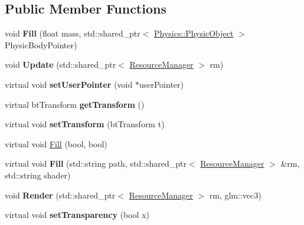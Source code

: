 \subsection*{Public Member Functions}
\begin{DoxyCompactItemize}
\item 
void {\bfseries Fill} (float mass, std\+::shared\+\_\+ptr$<$ \hyperlink{class_physics_1_1_physic_object}{Physics\+::\+Physic\+Object} $>$ Physic\+Body\+Pointer)\hypertarget{class_component_1_1_physic_component_a8bdf756aed442b6ca55005c9d4574a1d}{}\label{class_component_1_1_physic_component_a8bdf756aed442b6ca55005c9d4574a1d}

\item 
void {\bfseries Update} (std\+::shared\+\_\+ptr$<$ \hyperlink{class_resource_manager}{Resource\+Manager} $>$ rm)\hypertarget{class_component_1_1_physic_component_a192e66143fd3dcd71453b5e96c7337c9}{}\label{class_component_1_1_physic_component_a192e66143fd3dcd71453b5e96c7337c9}

\item 
virtual void {\bfseries set\+User\+Pointer} (void $\ast$user\+Pointer)\hypertarget{class_component_1_1_physic_component_a9781ceeeaece338cecded734ad403bf1}{}\label{class_component_1_1_physic_component_a9781ceeeaece338cecded734ad403bf1}

\item 
virtual bt\+Transform {\bfseries get\+Transform} ()\hypertarget{class_component_1_1_physic_component_aaa220e6fc967ae7cc9cc7cd58fa3ce86}{}\label{class_component_1_1_physic_component_aaa220e6fc967ae7cc9cc7cd58fa3ce86}

\item 
virtual void {\bfseries set\+Transform} (bt\+Transform t)\hypertarget{class_component_1_1_physic_component_acb4610f231b36a154715b5c7bc22479f}{}\label{class_component_1_1_physic_component_acb4610f231b36a154715b5c7bc22479f}

\item 
virtual void \hyperlink{class_component_1_1_physic_component_a2aa38ff30a247be21fae04ac78e6188e}{Fill} (bool, bool)
\item 
virtual void {\bfseries Fill} (std\+::string path, std\+::shared\+\_\+ptr$<$ \hyperlink{class_resource_manager}{Resource\+Manager} $>$ \&rm, std\+::string shader)\hypertarget{class_component_1_1_physic_component_a1a314003e28bcb0e533762a52ce55b89}{}\label{class_component_1_1_physic_component_a1a314003e28bcb0e533762a52ce55b89}

\item 
void {\bfseries Render} (std\+::shared\+\_\+ptr$<$ \hyperlink{class_resource_manager}{Resource\+Manager} $>$ rm, glm\+::vec3)\hypertarget{class_component_1_1_physic_component_afe545e4cd5fc20c8932d7a9305542a06}{}\label{class_component_1_1_physic_component_afe545e4cd5fc20c8932d7a9305542a06}

\item 
virtual void {\bfseries set\+Transparency} (bool x)\hypertarget{class_component_1_1_physic_component_a689745c64f64e6edffab736810976cae}{}\label{class_component_1_1_physic_component_a689745c64f64e6edffab736810976cae}

\end{DoxyCompactItemize}
